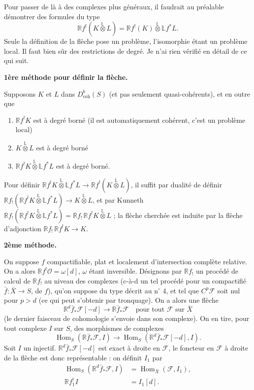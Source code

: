 \documentclass[12pt]{amsart}
\theoremstyle{plain}
\theoremstyle{definition}
\DeclareMathOperator{\Hom}{Hom}
\newcommand{\coh}{\text{coh}}
\newcommand{\cF}{\mathcal{F}}
\newcommand{\cO}{\mathcal{O}}
\newcommand{\cDb}{D^{b}}
\newcommand{\bR}{\mathbb{R}}
\newcommand{\bL}{\mathbb{L}}
\begin{document}
Pour passer de l\`a \`a des complexes plus g\'en\'eraux, il faudrait au pr\'ealable d\'emontrer des formules du type
\[
\bR f^{!}(K \overset{\mathbb{L}}{\otimes} L) = \bR f^{!}(K) \overset{\mathbb{L}}{\otimes} \bL f^{*}L.
\]
Seule la d\'efinition de la fl\`eche pose un probl\`eme, l'isomorphie \'etant un probl\`eme local. Il faut bien s\^ur des restrictions de degr\'e. Je n'ai rien v\'erifi\'e en d\'etail de ce qui suit.

\textbf{1\`ere m\'ethode pour d\'efinir la fl\`eche.}

Supposons $K$ et $L$ dans $\cDb_{\coh}(S)$ (et pas seulement quasi-coh\'erents), et en outre que
\begin{enumerate}
\item[a)] $\bR f^{!}K$ est \`a degr\'e born\'e (il est automatiquement coh\'erent, c'est un probl\`eme local)
\item[b)] $K \overset{\mathbb{L}}{\otimes} L$ est \`a degr\'e born\'e
\item[c)] $\bR f^{!}K \overset{\mathbb{L}}{\otimes} \bL f^{*}L$ est \`a degr\'e born\'e.
\end{enumerate}

Pour d\'efinir $\bR f^{!}K \overset{\mathbb{L}}{\otimes} \bL f^{*}L \to \bR f^{!}(K \overset{\mathbb{L}}{\otimes} L)$, il suffit par dualit\'e de d\'efinir $\bR f_{!}(\bR f^{!}K \overset{\mathbb{L}}{\otimes} \bL f^{*}L) \to K \overset{\mathbb{L}}{\otimes} L$, et par Kunneth $\bR f_{!}(\bR f^{!}K \overset{\mathbb{L}}{\otimes} \bL f^{*}L) = \bR f_{!}\,\bR f^{!}K \overset{\mathbb{L}}{\otimes} L$ ; la fl\`eche cherch\'ee est induite par la fl\`eche d'adjonction $\bR f_{!}\,\bR f^{!}K \to K$.

\textbf{2\`eme m\'ethode.}

On suppose $f$ compactifiable, plat et localement d'intersection compl\`ete relative. On a alors $\bR f^{!}\cO = \omega[d]$, $\omega$ \'etant inversible. D\'esignons par $\bR f_{!}$ un proc\'ed\'e de calcul de $\bR f_{!}$ au niveau des complexes (c-\`a-d un tel proc\'ed\'e pour un compactifi\'e $\bar{f}: \bar{X} \to S$, de $f$), qu'on suppose du type d\'ecrit au n$^{\circ}$ 4, et tel que $C^{p}\cF$ soit nul pour $p > d$ (ce qui peut s'obtenir par tronquage). On a alors une fl\`eche
\[
\bR^{d}\bar{f}_{*}\cF[-d] \to \bR\bar{f}_{*}\cF \quad \text{pour tout } \cF \text{ sur } \bar{X}
\]
(le dernier faisceau de cohomologie s'envoie dans son complexe). On en tire, pour tout complexe $I$ sur $S$, des morphismes de complexes
\[
\Hom_{S}(\bR\bar{f}_{*}\cF, I) \longrightarrow \Hom_{S}(\bR^{d}\bar{f}_{*}\cF[-d], I).
\]
Soit $I$ un injectif. $\bR^{d}\bar{f}_{*}\cF[-d]$ est exact \`a droite en $\cF$, le foncteur en $\cF$ \`a droite de la fl\`eche est donc repr\'esentable : on d\'efinit $I_{1}$ par
\[
\begin{aligned}
\Hom_{S}(\bR^{d}\bar{f}_{*}\cF, I) &= \Hom_{\bar{X}}(\cF, I_{1}),\\
\bR f^{!}_{1}I &= I_{1}[d].
\end{aligned}
\]
\end{document}
